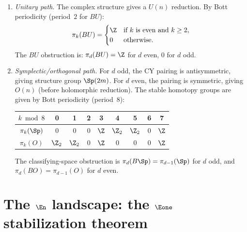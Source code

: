\begin{enumerate}[label=(\Alph*)]
 \item \emph{Unitary path.} The complex structure gives a $U(n)$ reduction. By Bott periodicity (period~$2$ for $BU$):
 \[
 \pi_k(BU) = \begin{cases} \Z & \text{if $k$ is even and $k \geq 2$,} \\ 0 & \text{otherwise.} \end{cases}
 \]
 The $BU$ obstruction is: $\pi_d(BU) = \Z$ for $d$ even, $0$ for $d$ odd.

 \item \emph{Symplectic/orthogonal path.} For $d$ odd, the CY pairing is antisymmetric, giving structure group $\Sp(2m)$. For $d$ even, the pairing is symmetric, giving $O(n)$ (before holomorphic reduction). The stable homotopy groups are given by Bott periodicity (period~$8$):
 \begin{center}
 \renewcommand{\arraystretch}{1.1}
 \begin{tabular}{c|cccccccc}
 $k \bmod 8$ & 0 & 1 & 2 & 3 & 4 & 5 & 6 & 7 \\
 \hline
 $\pi_k(\Sp)$ & 0 & 0 & 0 & $\Z$ & $\Z_2$ & $\Z_2$ & 0 & $\Z$ \\
 $\pi_k(O)$ & $\Z_2$ & $\Z_2$ & 0 & $\Z$ & 0 & 0 & 0 & $\Z$
 \end{tabular}
 \end{center}
 The classifying-space obstruction is $\pi_d(B\Sp) = \pi_{d-1}(\Sp)$ for $d$ odd, and $\pi_d(BO) = \pi_{d-1}(O)$ for $d$ even.
\end{enumerate}


\section{The \texorpdfstring{$\En$}{E-n} landscape: the \texorpdfstring{$\Eone$}{E1} stabilization theorem}
\label{sec:e1-stabilization}

